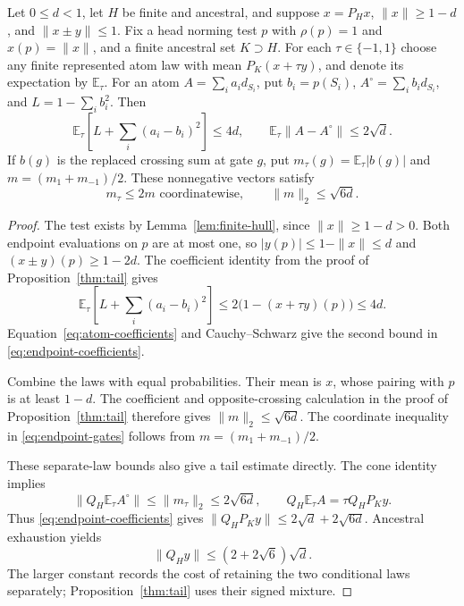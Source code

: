 \begin{proposition}\label{prop:endpoint}
Let $0\le d<1$, let $H$ be finite and ancestral, and suppose
$x=P_Hx$, $\|x\|\ge1-d$, and $\|x\pm y\|\le1$. Fix a head
norming test $p$ with $\rho(p)=1$ and $x(p)=\|x\|$, and a finite
ancestral set $K\supset H$. For each $\tau\in\{-1,1\}$ choose
any finite represented atom law with mean $P_K(x+\tau y)$, and denote
its expectation by $\mathbb E_\tau$. For an atom $A=\sum_i a_i d_{S_i}$,
put $b_i=p(S_i)$, $A^\circ=\sum_i b_i d_{S_i}$, and
$L=1-\sum_i b_i^2$. Then
\begin{equation}\label{eq:endpoint-coefficients}
 \mathbb E_\tau\!\left[L+\sum_i(a_i-b_i)^2\right]\le4d,
 \qquad \mathbb E_\tau\|A-A^\circ\|\le2\sqrt d.
\end{equation}
If $b(g)$ is the replaced crossing sum at gate $g$, put
$m_\tau(g)=\mathbb E_\tau|b(g)|$ and
$m=(m_1+m_{-1})/2$. These nonnegative vectors satisfy
\begin{equation}\label{eq:endpoint-gates}
 m_\tau\le2m\text{ coordinatewise},\qquad\|m\|_2\le\sqrt{6d}.
\end{equation}
\end{proposition}

\begin{proof}
The test exists by Lemma~\ref{lem:finite-hull}, since
$\|x\|\ge1-d>0$. Both endpoint evaluations on $p$ are at most one,
so $|y(p)|\le1-\|x\|\le d$ and $(x\pm y)(p)\ge1-2d$.
The coefficient identity from the proof of Proposition~\ref{thm:tail} gives
\[
 \mathbb E_\tau\!\left[L+\sum_i(a_i-b_i)^2\right]
 \le2\bigl(1-(x+\tau y)(p)\bigr)\le4d.
\]
Equation~\eqref{eq:atom-coefficients} and Cauchy--Schwarz give the
second bound in \eqref{eq:endpoint-coefficients}.

Combine the laws with equal probabilities. Their mean is $x$, whose
pairing with $p$ is at least $1-d$. The coefficient and opposite-crossing
calculation in the proof of Proposition~\ref{thm:tail} therefore gives
$\|m\|_2\le\sqrt{6d}$. The coordinate inequality in
\eqref{eq:endpoint-gates} follows from $m=(m_1+m_{-1})/2$.

These separate-law bounds also give a tail estimate directly. The cone
identity implies
\[
 \|Q_H\mathbb E_\tau A^\circ\|\le\|m_\tau\|_2\le2\sqrt{6d},
 \qquad Q_H\mathbb E_\tau A=\tau Q_HP_Ky.
\]
Thus \eqref{eq:endpoint-coefficients} gives
$\|Q_HP_Ky\|\le2\sqrt d+2\sqrt{6d}$. Ancestral exhaustion yields
\[
 \|Q_Hy\|\le(2+2\sqrt6)\sqrt d.
\]
The larger constant records the cost of retaining the two conditional
laws separately; Proposition~\ref{thm:tail} uses their signed mixture.
\end{proof}

